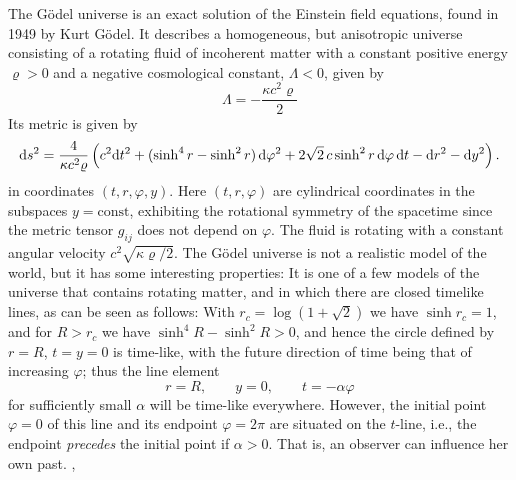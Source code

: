 \begin{beispiel}
The Gödel universe is an exact solution of the Einstein field equations, found in 1949 by Kurt Gödel. \cite{Goedel-1949}
It describes a homogeneous, but anisotropic universe consisting of a rotating fluid of incoherent matter with a constant  positive energy $\varrho > 0$ and a negative cosmological constant, $\Lambda < 0$, given by
\begin{equation}
	\Lambda 
	= - \frac{\kappa c^2 \varrho}{2}
\end{equation}
Its metric is given by
\begin{equation}
	\mathrm{d} s^2 
	= 
	\frac{4}{\kappa c^2 \varrho}
	\left(
		c^2 \mathrm{d} t^2
		+ (\sinh^4 r - \sinh^2 r) \,\mathrm{d} \varphi^2 + 2 \sqrt{2} \, c \sinh^2 r \,\mathrm{d} \varphi \,\mathrm{d} t
		- \mathrm{d} r^2 - \mathrm{d} y^2
	\right)
	.
\end{equation}
in coordinates $(t, r, \varphi, y)$.
Here $(t, r, \varphi)$ are cylindrical coordinates in the subspaces $y = \mathrm{const}$, exhibiting the rotational symmetry of the spacetime since the metric tensor $g_{ij}$ does not depend on $\varphi$.
The fluid is rotating with a constant angular velocity 
$c^2\sqrt{\kappa \varrho/2}$. %
\cite[252]{Stephani-1991}
The Gödel universe is not a realistic model of the world, but it has some interesting properties: It is one of a few models of the universe that contains rotating matter, and in which there are closed timelike lines, as can be seen as follows: With $r_c = \log (1 + \sqrt{2})$ we have $\sinh r_c = 1$, and for $R > r_c$ we have $\sinh^4 R - \sinh^2 R > 0$, and hence the circle defined by $r = R$, $t = y = 0$ is time-like, with the future direction of time being that of increasing $\varphi$; thus the line element
\begin{equation}
	r=R, \qquad y=0, \qquad t=-\alpha \varphi
\end{equation}
for sufficiently small $\alpha$ will be time-like everywhere. However, the initial point $\varphi = 0$ of this line and its endpoint $\varphi = 2 \pi$ are situated on the $t$-line, i.e., the endpoint \emph{precedes} the initial point if $\alpha > 0$.
That is, an observer can influence her own past. \cite[449]{Goedel-1949}, \cite[252]{Stephani-1991}
\end{beispiel}


